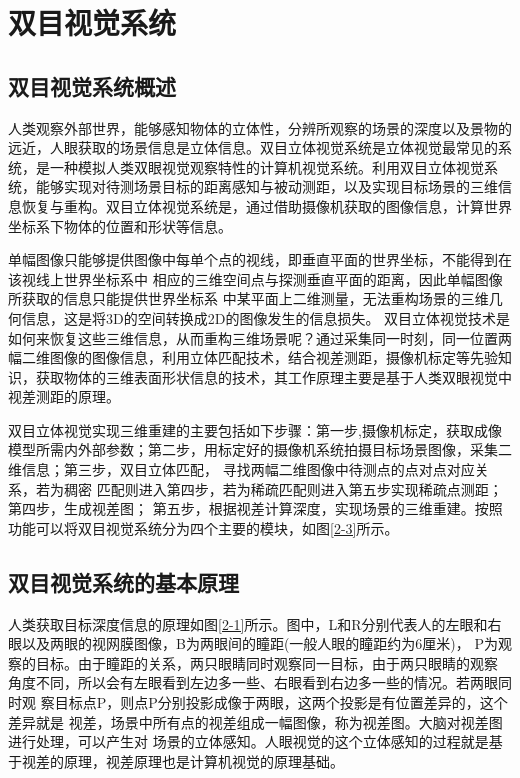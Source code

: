 
\chapter{双目视觉系统}

\section{双目视觉系统概述}
人类观察外部世界，能够感知物体的立体性，分辨所观察的场景的深度以及景物的远近，人眼获取的场景信息是立体信息。双目立体视觉系统是立体视觉最常见的系统，是一种模拟人类双眼视觉观察特性的计算机视觉系统。利用双目立体视觉系统，能够实现对待测场景目标的距离感知与被动测距，以及实现目标场景的三维信息恢复与重构。双目立体视觉系统是，通过借助摄像机获取的图像信息，计算世界坐标系下物体的位置和形状等信息。

单幅图像只能够提供图像中每单个点的视线，即垂直平面的世界坐标，不能得到在该视线上世界坐标系中
相应的三维空间点与探测垂直平面的距离，因此单幅图像所获取的信息只能提供世界坐标系
中某平面上二维测量，无法重构场景的三维几何信息，这是将3D的空间转换成2D的图像发生的信息损失。
双目立体视觉技术是如何来恢复这些三维信息，从而重构三维场景呢？通过采集同一时刻，同一位置两幅二维图像的图像信息，利用立体匹配技术，结合视差测距，摄像机标定等先验知识，获取物体的三维表面形状信息的技术，其工作原理主要是基于人类双眼视觉中视差测距的原理。

双目立体视觉实现三维重建的主要包括如下步骤：第一步,摄像机标定，获取成像模型所需内外部参数；第二步，用标定好的摄像机系统拍摄目标场景图像，采集二维信息；第三步，双目立体匹配，
寻找两幅二维图像中待测点的点对点对应关系，若为稠密
匹配则进入第四步，若为稀疏匹配则进入第五步实现稀疏点测距；第四步，生成视差图；
第五步，根据视差计算深度，实现场景的三维重建。按照功能可以将双目视觉系统分为四个主要的模块，如图\ref{2-3}所示。


\section{双目视觉系统的基本原理}

人类获取目标深度信息的原理如图\ref{2-1}所示。图中，L和R分别代表人的左眼和右眼以及两眼的视网膜图像，B为两眼间的瞳距(一般人眼的瞳距约为6厘米)，
P为观察的目标。由于瞳距的关系，两只眼睛同时观察同一目标，由于两只眼睛的观察
角度不同，所以会有左眼看到左边多一些、右眼看到右边多一些的情况。若两眼同时观
察目标点P，则点P分别投影成像于两眼，这两个投影是有位置差异的，这个差异就是
视差，场景中所有点的视差组成一幅图像，称为视差图。大脑对视差图进行处理，可以产生对
场景的立体感知。人眼视觉的这个立体感知的过程就是基于视差的原理，视差原理也是计算机视觉的原理基础。

